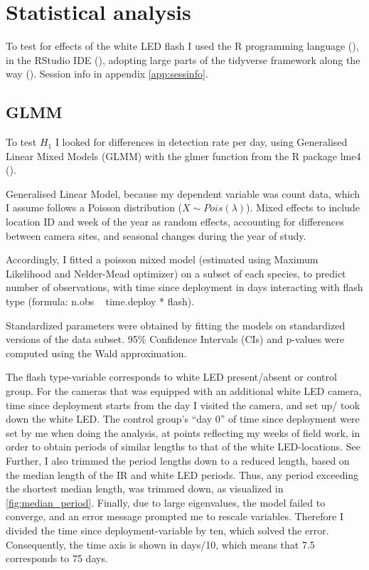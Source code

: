 \section{Statistical analysis} %

To test for effects of the white LED flash I used the R programming language (\cite{RCoreTeam2020}), in the RStudio IDE (\cite{RStudioTeam2020a}), adopting large parts of the tidyverse framework along the way (\cite{tidyverse}). Session info in appendix \ref{app:sessinfo}. %


	\subsection*{GLMM}
To test $H_{1}$ I looked for differences in detection rate per day, using Generalised Linear Mixed Models (GLMM) with the glmer function from the R package lme4 (\cite{lme4}).

Generalised Linear Model, because my dependent variable was count data, which I assume follows a Poisson distribution ($ X \sim Pois(\lambda) $).
Mixed effects to include location ID and week of the year as random effects, accounting for differences between camera sites, and seasonal changes during the year of study.

Accordingly, I fitted a poisson mixed model (estimated using Maximum Likelihood and Nelder-Mead optimizer) on a subset of each species, to predict number of observations, with time since deployment in days interacting with flash type (formula: n.obs ~ time.deploy * flash).

Standardized parameters were obtained by fitting the models on standardized versions of the data subset. 95\% Confidence Intervals (CIs) and p-values were computed using the Wald approximation. 

The flash type-variable corresponds to white LED present/absent or control group.
For the cameras that was equipped with an additional white LED camera, time since deployment starts from the day I visited the camera, and set up/ took down the white LED.
The control group’s “day 0” of time since deployment were set by me when doing the analysis, at points reflecting my weeks of field work, in order to obtain periods of similar lengths to that of the white LED-locations. See 
Further, I also trimmed the period lengths down to a reduced length, based on the median length of the IR and white LED periods. Thus, any period exceeding the shortest median length, was trimmed down, as visualized in \ref{fig:median_period}.
Finally, due to large eigenvalues, the model failed to converge, and an error message prompted me to rescale variables.
Therefore I divided the time since deployment-variable by ten, which solved the error.
Consequently, the time axis is shown in days/10, which means that 7.5 corresponds to 75 days.



